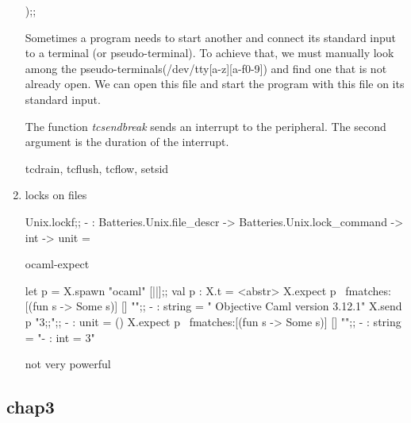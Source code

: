 \begin{enumerate}
\begin{ocamlcode}
);;
\end{ocamlcode}
 Sometimes a program needs to start another and connect its standard
 input to a terminal (or pseudo-terminal). To achieve that, we must
 manually look among the pseudo-terminals(/dev/tty[a-z][a-f0-9]) and
 find one that is not already open. We can open this file and start
 the program with this file on its standard input.

 The function \textit{tcsendbreak} sends an interrupt to the
 peripheral. The second argument is the duration of the interrupt.


 \begin{bluetext}
   tcdrain, tcflush, tcflow, setsid
 \end{bluetext}

\item locks on files
  \begin{bluetext}
Unix.lockf;;
- : Batteries.Unix.file_descr -> Batteries.Unix.lock_command -> int -> unit =    
\end{bluetext}

ocaml-expect
\begin{alternate}
let p = X.spawn "ocaml" [||];;
val p : X.t = <abstr>
X.expect p ~fmatches:[(fun s -> Some s)] [] "";;
- : string = "        Objective Caml version 3.12.1"
X.send p "3;;\n";;
- : unit = ()
X.expect p ~fmatches:[(fun s -> Some s)] [] "";;
- : string = "- : int = 3"  
\end{alternate}

not very powerful
\end{enumerate}

\subsection{chap3}
\label{sec:chap3}



